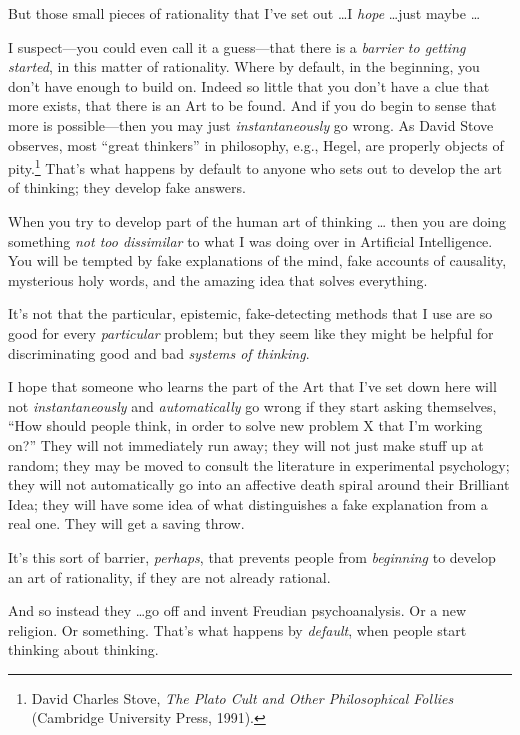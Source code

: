 {
 But those small pieces of rationality that I've
set out \ldots I \textit{hope} \ldots just maybe \ldots}

{
 I suspect---you could even call it a guess---that there is a
\textit{barrier to getting started}, in this matter of rationality.
Where by default, in the beginning, you don't have
enough to build on. Indeed so little that you don't
have a clue that more exists, that there is an Art to be found. And if
you do begin to sense that more is possible---then you may just
\textit{instantaneously} go wrong. As David Stove observes, most
``great thinkers'' in philosophy,
e.g., Hegel, are properly objects of pity.\footnote{David Charles Stove, \textit{The Plato Cult and Other
Philosophical Follies} (Cambridge University Press, 1991).}
That's what happens by default to anyone who sets out
to develop the art of thinking; they develop fake answers.}

{
 When you try to develop part of the human art of thinking \ldots
then you are doing something \textit{not too dissimilar} to what I was
doing over in Artificial Intelligence. You will be tempted by fake
explanations of the mind, fake accounts of causality, mysterious holy
words, and the amazing idea that solves everything.}

{
 It's not that the particular, epistemic,
fake-detecting methods that I use are so good for every
\textit{particular} problem; but they seem like they might be helpful
for discriminating good and bad \textit{systems of thinking}.}

{
 I hope that someone who learns the part of the Art that
I've set down here will not \textit{instantaneously}
and \textit{automatically} go wrong if they start asking themselves,
``How should people think, in order to solve new
problem X that I'm working on?'' They
will not immediately run away; they will not just make stuff up at
random; they may be moved to consult the literature in experimental
psychology; they will not automatically go into an affective death
spiral around their Brilliant Idea; they will have some idea of what
distinguishes a fake explanation from a real one. They will get a
saving throw.}

{
 It's this sort of barrier, \textit{perhaps}, that
prevents people from \textit{beginning} to develop an art of
rationality, if they are not already rational.}

{
 And so instead they \ldots go off and invent Freudian
psychoanalysis. Or a new religion. Or something. That's
what happens by \textit{default}, when people start thinking about
thinking.}


